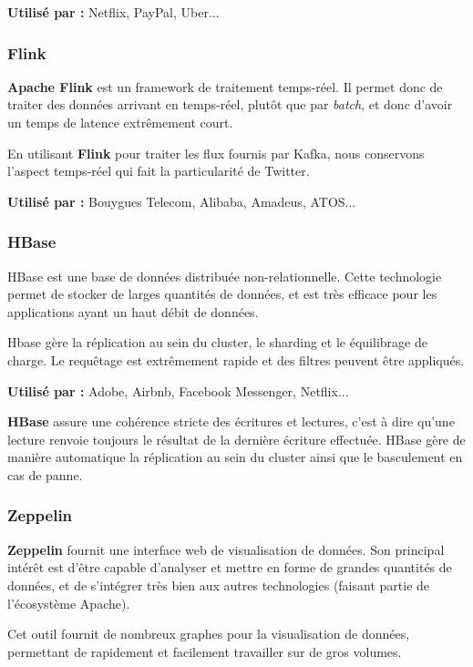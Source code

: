\documentclass[a4paper,oneside,10pt]{article}
\begin{document}
\textbf{Utilisé par :} Netflix, PayPal, Uber...


\subsubsection{Flink}

\textbf{Apache Flink} est un framework de traitement temps-réel. Il permet donc de traiter des données arrivant en temps-réel, plutôt que par \textit{batch}, et donc d'avoir un temps de latence extrêmement court.

En utilisant \textbf{Flink} pour traiter les flux fournis par Kafka, nous conservons l'aspect temps-réel qui fait la particularité de Twitter.

\textbf{Utilisé par :} Bouygues Telecom, Alibaba, Amadeus, ATOS...

\subsubsection{HBase}

HBase est une base de données distribuée non-relationnelle. Cette technologie permet de stocker de larges quantités de données, et est très efficace pour les applications ayant un haut débit de données.

Hbase gère la réplication au sein du cluster, le sharding et le équilibrage de charge. Le requêtage est extrêmement rapide et des filtres peuvent être appliqués.

\textbf{Utilisé par :} Adobe, Airbnb, Facebook Messenger, Netflix...

\textbf{HBase} assure une cohérence stricte des écritures et lectures, c'est à dire qu'une lecture renvoie toujours le résultat de la dernière écriture effectuée.
HBase gère de manière automatique la réplication au sein du cluster ainsi que le basculement en cas de panne.

\subsubsection{Zeppelin}

\textbf{Zeppelin} fournit une interface web de visualisation de données. Son principal intérêt est d'être capable d'analyser et mettre en forme de grandes quantités de données, et de s'intégrer très bien aux autres technologies (faisant partie de l'écosystème Apache).

Cet outil fournit de nombreux graphes pour la visualisation de données, permettant de rapidement et facilement travailler sur de gros volumes.
\end{document}
